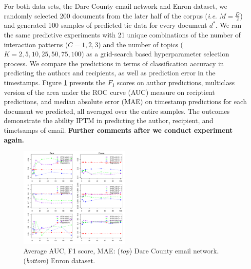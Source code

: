 \documentclass[twoside]{article}
\begin{document}
 For both data sets, the Dare County email network and Enron dataset, we randomly selected 200 documents from the later half of the corpus (\textit{i.e.} $M = \frac{D}{2}$) and generated 100 samples of predicted tie data for every document $d^*$. We ran the same predictive experiments with 21 unique combinations of the number of interaction patterns ($C = 1, 2, 3$) and the number of topics ($K = 2, 5, 10, 25, 50, 75, 100$) as a grid-search based hyperparameter selection process. We compare the predictions in terms of classification accuracy in predicting the authors and recipients, as well as prediction error in the timestamps. Figure \ref{fig:PPE} presents the $F_1$ scores on author predictions, multiclass version of the area under the ROC curve (AUC) measure \citep{hand2001simple} on reciptient predictions, and median absolute error (MAE) on timestamp predictions for each document we predicted, all averaged over the entire samples. The outcomes demonstrate the ability IPTM in predicting the author, recipient, and timetsamps of email. \textbf{Further comments after we conduct experiment again.}
 \begin{figure}[h]
 	\centering
	\includegraphics[width=0.49\textwidth, trim= 0.7cm 0cm 0cm 0cm, clip=true]{plots/PPE.pdf}  
 	\caption{Average AUC, F1 score, MAE: (\textit{top}) Dare County email network. (\textit{bottom}) Enron dataset.}
 	 	\label{fig:PPE}	
 	 \end{figure}
\end{document}
